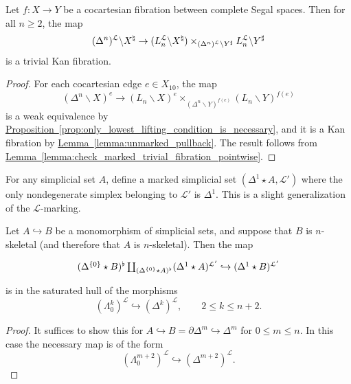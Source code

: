 \documentclass[main.tex]{subfiles}
\begin{document}
\begin{corollary}
  \label{cor:marked_left_spine_gives_triv_fib}
  Let $f\colon X \to Y$ be a cocartesian fibration between complete Segal spaces. Then for all $n \geq 2$, the map
  \begin{equation*}
    (\Delta^{n})^{\mathcal{L}} \backslash X^{\natural} \to (L_{n}^{\mathcal{L}} \backslash X^{\natural}) \times_{(\Delta^{n})^{\mathcal{L}} \backslash Y^{\sharp}} L_{n}^{\mathcal{L}} \backslash Y^{\sharp}
  \end{equation*}
  is a trivial Kan fibration.
\end{corollary}
\begin{proof}
  For each cocartesian edge $e \in X_{10}$, the map
  \begin{equation*}
    (\Delta^{n} \backslash X)^{e} \to (L_{n} \backslash X)^{e} \times_{(\Delta^{n} \backslash Y)^{f(e)}} (L_{n} \backslash Y)^{f(e)}
  \end{equation*}
  is a weak equivalence by \hyperref[prop:only_lowest_lifting_condition_is_necessary]{Proposition~\ref*{prop:only_lowest_lifting_condition_is_necessary}}, and it is a Kan fibration by \hyperref[lemma:unmarked_pullback]{Lemma~\ref*{lemma:unmarked_pullback}}. The result follows from \hyperref[lemma:check_marked_trivial_fibration_pointwise]{Lemma~\ref*{lemma:check_marked_trivial_fibration_pointwise}}.
\end{proof}

For any simplicial set $A$, define a marked simplicial set $(\Delta^{1} \star A, \mathcal{L'})$ where the only nondegenerate simplex belonging to $\mathcal{L}'$ is $\Delta^{1}$. This is a slight generalization of the $\mathcal{L}$-marking.

\begin{lemma}
  \label{lemma:starred_smash_with_mono}
  Let $A \hookrightarrow B$ be a monomorphism of simplicial sets, and suppose that $B$ is $n$-skeletal (and therefore that $A$ is $n$-skeletal). Then the map
  \begin{equation*}
    \begin{tikzcd}
      (\Delta^{\{0\}} \star B)^{\flat} \coprod_{(\Delta^{\{0\}} \star A)^{\flat}} (\Delta^{1} \star A)^{\mathcal{L}'} \hookrightarrow (\Delta^{1} \star B)^{\mathcal{L}'}
    \end{tikzcd}
  \end{equation*}
  is in the saturated hull of the morphisms
  \begin{equation*}
    (\Lambda^{k}_{0})^{\mathcal{L}} \hookrightarrow (\Delta^{k})^{\mathcal{L}},\qquad 2 \leq k \leq n+2.
  \end{equation*}
\end{lemma}
\begin{proof}
  It suffices to show this for $A \hookrightarrow B = \partial \Delta^{m} \hookrightarrow \Delta^{m}$ for $0 \leq m \leq n$. In this case the necessary map is of the form
  \begin{equation*}
    (\Lambda^{m+2}_{0})^{\mathcal{L}} \hookrightarrow (\Delta^{m+2})^{\mathcal{L}}.
  \end{equation*}
\end{proof}
\end{document}
